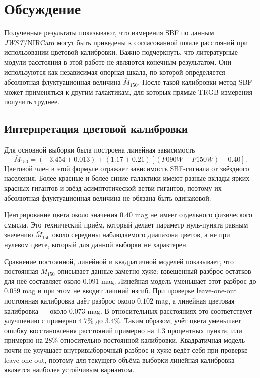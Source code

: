 \documentclass[12pt,a4paper]{article}
\begin{document}
\section{Обсуждение}

Полученные результаты показывают, что измерения SBF по данным \textit{JWST}/NIRCam могут быть приведены к согласованной шкале расстояний при использовании цветовой калибровки. Важно подчеркнуть, что литературные модули расстояния в этой работе не являются конечным результатом. Они используются как независимая опорная шкала, по которой определяется абсолютная флуктуационная величина $\bar{M}_{150}$. После такой калибровки метод SBF может применяться к другим галактикам, для которых прямые TRGB-измерения получить труднее.

\subsection{Интерпретация цветовой калибровки}

Для основной выборки была построена линейная зависимость
\begin{equation}
    \bar{M}_{150} =
    (-3.454 \pm 0.013) +
    (1.17 \pm 0.21)\left[(F090W-F150W)-0.40\right].
\end{equation}
Цветовой член в этой формуле отражает зависимость SBF-сигнала от звёздного населения. Более красные и более синие галактики имеют разные вклады ярких красных гигантов и звёзд асимптотической ветви гигантов, поэтому их абсолютная флуктуационная величина не обязана быть одинаковой.

Центрирование цвета около значения $0.40$ mag не имеет отдельного физического смысла. Это технический приём, который делает параметр нуль-пункта равным значению $\bar{M}_{150}$ около середины наблюдаемого диапазона цветов, а не при нулевом цвете, который для данной выборки не характерен.

Сравнение постоянной, линейной и квадратичной моделей показывает, что постоянная $\bar{M}_{150}$ описывает данные заметно хуже: взвешенный разброс остатков для неё составляет около $0.091$ mag. Линейная модель уменьшает этот разброс до $0.059$ mag и при этом не вводит лишний изгиб. При проверке leave-one-out постоянная калибровка даёт разброс около $0.102$ mag, а линейная цветовая калибровка --- около $0.073$ mag. В относительных расстояниях это соответствует улучшению с примерно $4.7\%$ до $3.4\%$. Таким образом, учёт цвета уменьшает ошибку восстановления расстояний примерно на $1.3$ процентных пункта, или примерно на $28\%$ относительно постоянной калибровки. Квадратичная модель почти не улучшает внутривыборочный разброс и хуже ведёт себя при проверке leave-one-out, поэтому для текущего объёма выборки линейная калибровка является наиболее устойчивым вариантом.
\end{document}
